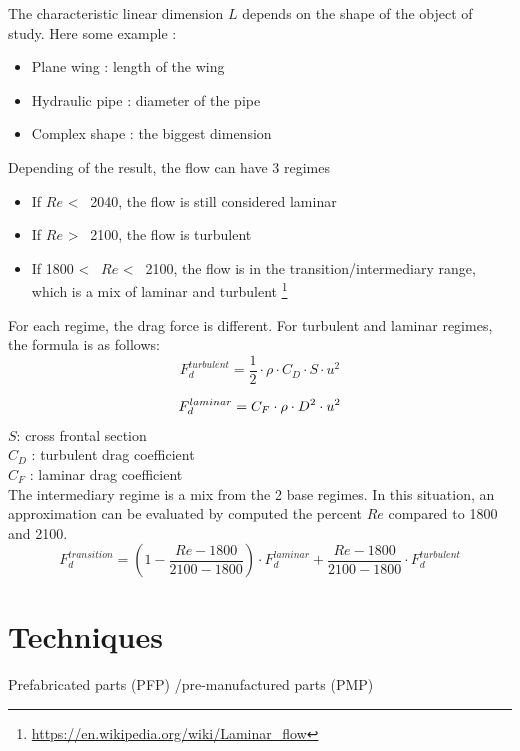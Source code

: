\documentclass[12pt,a4paper]{article}
\begin{document}
	The characteristic linear dimension $L$ depends on the shape of the object of study. Here some example : 
	\begin{itemize}
		\item Plane wing : length of the wing
		\item Hydraulic pipe : diameter of the pipe
		\item Complex shape : the biggest dimension
	\end{itemize}
	Depending of the result, the flow can have 3 regimes
	
	\begin{itemize}
		\item If $Re$ <~ 2040, the flow is still considered laminar 
		\item If $Re$ >~ 2100, the flow is turbulent
		\item If 1800 <~ $Re$ <~ 2100, the flow is in the transition/intermediary range, which is a mix of laminar and turbulent \footnote{\url{https://en.wikipedia.org/wiki/Laminar_flow}}
	\end{itemize}
	
	For each regime, the drag force is different. 
	For turbulent and laminar regimes, the formula is as follows:
	\begin{equation}
		F_d^{turbulent} = \frac{1}{2} \cdot \rho \cdot C_D \cdot S \cdot u^2
	\end{equation}
	
	\begin{equation}
		F_d^{laminar} = C_F \cdot \rho \cdot  D^2 \cdot u^2\\
	\end{equation}
	$S$: cross frontal section\\
	$C_D$ : turbulent drag coefficient\\
	$C_F$ : laminar drag coefficient\\
	
	The intermediary regime is a mix from the 2 base regimes. In this situation, an approximation can be evaluated by computed the percent $Re$ compared to 1800 and 2100. 
	\begin{equation}
		F_d^{transition} = (1- \frac{Re - 1800}{2100-1800}) \cdot F_d^{laminar} + \frac{Re - 1800}{2100-1800} \cdot F_d^{turbulent}
	\end{equation}
	
	
	\newpage
	\section{Techniques}
	Prefabricated parts (PFP) /pre-manufactured parts (PMP)
	
\end{document}
